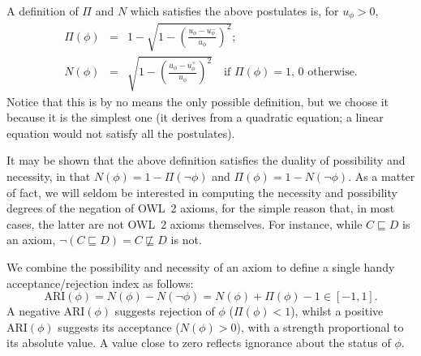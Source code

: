 \documentclass{llncs}
\begin{document}
A definition of $\Pi$ and $N$ which satisfies the above postulates is, for $u_\phi > 0$,
\begin{eqnarray}
  \Pi(\phi) &=& 1 - \sqrt{1 - \left(\frac{u_\phi - u_\phi^-}{u_\phi}\right)^2}; \\
  N(\phi) &=& \sqrt{1 - \left(\frac{u_\phi - u_\phi^+}{u_\phi}\right)^2}\quad
    \mbox{if $\Pi(\phi) = 1$, 0 otherwise.}
\end{eqnarray}
Notice that this is by no means the only possible definition, but we choose it because
it is the simplest one (it derives from a quadratic equation; a linear equation would
not satisfy all the postulates).

It may be shown that the above definition satisfies the duality of
possibility and necessity, in that $N(\phi) = 1 - \Pi(\neg\phi)$ and
$\Pi(\phi) = 1 - N(\neg\phi)$.
As a matter of fact, we will seldom be interested in computing the necessity and
possibility degrees of the negation of OWL~2 axioms, for the simple reason that, in most cases,
the latter are not OWL~2 axioms themselves. For instance, while $C \sqsubseteq D$
is an axiom, $\neg(C \sqsubseteq D) = C \not\sqsubseteq D$ is not.



We combine the possibility and necessity of an axiom to define
a single handy acceptance/rejection index as follows:
\begin{equation}\label{eq:ARI}
  \mathrm{ARI}(\phi) = N(\phi) - N(\neg\phi) = N(\phi) + \Pi(\phi) - 1 \in [-1, 1].
\end{equation}
A negative $\mathrm{ARI}(\phi)$ suggests rejection of $\phi$ ($\Pi(\phi)<1$),
whilst a positive $\mathrm{ARI}(\phi)$ suggests its acceptance ($N(\phi)>0$),
with a strength proportional to its absolute value. A value close to zero
reflects ignorance about the status of $\phi$.
\end{document}
